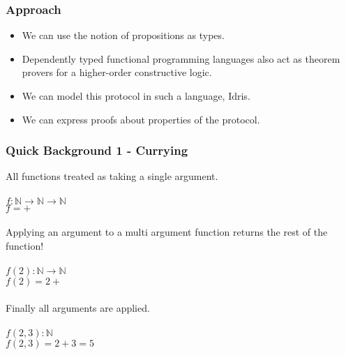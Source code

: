 \documentclass{beamer}
\begin{document}
\begin{frame}[fragile]
  \frametitle{Approach}
  \begin{itemize}
    \item We can use the notion of propositions as types.
    \item Dependently typed functional programming languages
            also act as theorem provers for a higher-order
                  constructive logic.
    \item We can model this protocol in such a language, Idris.
    \item We can express proofs about properties of the protocol.
  \end{itemize}
\end{frame}

\begin{frame}[fragile]
  \frametitle{Quick Background 1 - Currying}
  All functions treated as taking a single argument. \\ \\
  $f : \mathbb{N} \rightarrow \mathbb{N} \rightarrow \mathbb{N}$ \\
  $f = + $ \\ \\
  Applying an argument to a multi argument function returns the 
  rest of the function! \\ \\
  $f(2) : \mathbb{N} \rightarrow \mathbb{N}$ \\
  $f(2) = 2 + $ \\ \\
  Finally all arguments are applied. \\ \\
  $f(2, 3) : \mathbb{N}$ \\
  $f(2, 3) = 2 + 3 = 5 $
\end{frame}
\end{document}
